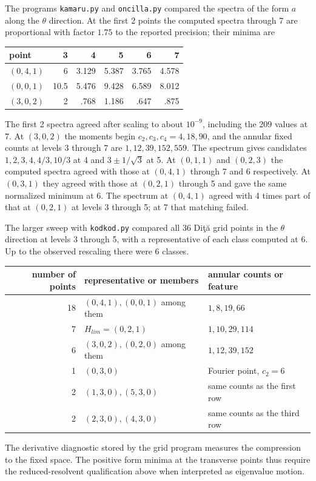 \documentclass[11pt,a4paper]{amsart}
\begin{document}
The programs \texttt{kamaru.py} and \texttt{oncilla.py} compared the spectra of the form $a$ along the $\theta$ direction. At the first 2 points the computed spectra through 7 are proportional with factor $1.75$ to the reported precision; their minima are
\begin{center}
\begin{tabular}{lrrrrr}
\toprule
point&3&4&5&6&7\\ \midrule
$(0,4,1)$&6&3.129&5.387&3.765&4.578\\
$(0,0,1)$&10.5&5.476&9.428&6.589&8.012\\
$(3,0,2)$&2&.768&1.186&.647&.875\\ \bottomrule
\end{tabular}
\end{center}
The first 2 spectra agreed after scaling to about $10^{-9}$, including the 209 values at 7. At $(3,0,2)$ the moments begin $c_2,c_3,c_4=4,18,90$, and the annular fixed counts at levels 3 through 7 are $1,12,39,152,559$. The spectrum gives candidates $1,2,3,4,4/3,10/3$ at 4 and $3\pm1/\sqrt3$ at 5. At $(0,1,1)$ and $(0,2,3)$ the computed spectra agreed with those at $(0,4,1)$ through 7 and 6 respectively. At $(0,3,1)$ they agreed with those at $(0,2,1)$ through 5 and gave the same normalized minimum at 6. The spectrum at $(0,4,1)$ agreed with 4 times part of that at $(0,2,1)$ at levels 3 through 5; at 7 that matching failed.

The larger sweep with \texttt{kodkod.py} compared all 36 Di\c t\u a grid points in the $\theta$ direction at levels 3 through 5, with a representative of each class computed at 6. Up to the observed rescaling there were 6 classes.
\begin{center}\small
\begin{tabular}{rll}
\toprule
number of points & representative or members & annular counts or feature\\ \midrule
18 & $(0,4,1),(0,0,1)$ among them & $1,8,19,66$\\
7 & $H_{lim}=(0,2,1)$ & $1,10,29,114$\\
6 & $(3,0,2),(0,2,0)$ among them & $1,12,39,152$\\
1 & $(0,3,0)$ & Fourier point, $c_2=6$\\
2 & $(1,3,0),(5,3,0)$ & same counts as the first row\\
2 & $(2,3,0),(4,3,0)$ & same counts as the third row\\ \bottomrule
\end{tabular}
\end{center}
The derivative diagnostic stored by the grid program measures the compression to the fixed space. The positive form minima at the transverse points thus require the reduced-resolvent qualification above when interpreted as eigenvalue motion.
\end{document}
